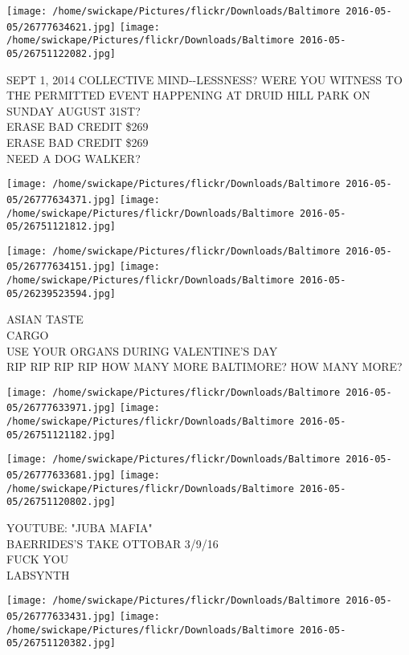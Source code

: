 \documentclass[10pt,letterpaper]{article}
\begin{document}
\texttt{[image: /home/swickape/Pictures/flickr/Downloads/Baltimore 2016-05-05/26777634621.jpg]}
\texttt{[image: /home/swickape/Pictures/flickr/Downloads/Baltimore 2016-05-05/26751122082.jpg]}

SEPT 1, 2014 COLLECTIVE MIND{-}{-}LESSNESS?  WERE YOU WITNESS TO THE PERMITTED EVENT HAPPENING AT DRUID HILL PARK ON SUNDAY AUGUST 31ST?\\
ERASE BAD CREDIT \$269\\
ERASE BAD CREDIT \$269\\
NEED A DOG WALKER?\\
\pagebreak

\texttt{[image: /home/swickape/Pictures/flickr/Downloads/Baltimore 2016-05-05/26777634371.jpg]}
\texttt{[image: /home/swickape/Pictures/flickr/Downloads/Baltimore 2016-05-05/26751121812.jpg]}

\texttt{[image: /home/swickape/Pictures/flickr/Downloads/Baltimore 2016-05-05/26777634151.jpg]}
\texttt{[image: /home/swickape/Pictures/flickr/Downloads/Baltimore 2016-05-05/26239523594.jpg]}

ASIAN TASTE\\
CARGO\\
USE YOUR ORGANS DURING VALENTINE'S DAY\\
RIP RIP RIP RIP HOW MANY MORE BALTIMORE?  HOW MANY MORE?\\
\pagebreak

\texttt{[image: /home/swickape/Pictures/flickr/Downloads/Baltimore 2016-05-05/26777633971.jpg]}
\texttt{[image: /home/swickape/Pictures/flickr/Downloads/Baltimore 2016-05-05/26751121182.jpg]}

\texttt{[image: /home/swickape/Pictures/flickr/Downloads/Baltimore 2016-05-05/26777633681.jpg]}
\texttt{[image: /home/swickape/Pictures/flickr/Downloads/Baltimore 2016-05-05/26751120802.jpg]}

YOUTUBE: "JUBA MAFIA"\\
BAERRIDES'S TAKE OTTOBAR 3/9/16\\
FUCK YOU\\
LABSYNTH\\
\pagebreak

\texttt{[image: /home/swickape/Pictures/flickr/Downloads/Baltimore 2016-05-05/26777633431.jpg]}
\texttt{[image: /home/swickape/Pictures/flickr/Downloads/Baltimore 2016-05-05/26751120382.jpg]}
\end{document}
